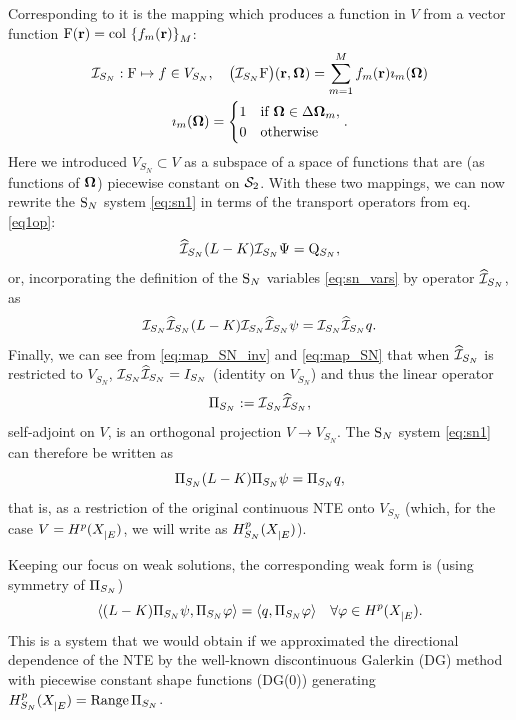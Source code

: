 Corresponding
to it is the mapping which produces a function in $V$ from a vector function \linebreak[4] 
\mbox{$\mathrm{F}(\br) = \colset{f_m(\br)}{\idxset{M}}$}:
\begin{equation}\label{eq:map_SN}
\begin{gathered}
\PiSN: \mathrm{F} \mapsto f\in V_{S_N},\quad
\bigl(\PiSN \mathrm{F}\bigr)(\br,\bomega) = \sum_{m=1}^M f_m(\br)\imath_m(\bomega)\\ 
\imath_m(\bomega) = \pw{1}{if $\bomega \in \Delta\bomega_m$}{0}{otherwise}.
\end{gathered}
\end{equation}
Here we introduced $V_{S_N}\subset V$ as a subspace of a space of functions that are (as functions of $\bomega$)
piecewise constant on $\Sphere$. With these two mappings, we can now rewrite the $\SN$ system
\eqref{eq:sn1} in terms of the transport operators from eq.
\eqref{eq1op}:
\begin{equation}\label{eq:sn_op}
	\PihSN (\op{L} - \op{K}) \PiSN \Psi = \mathrm{Q}_{S_N},
\end{equation}
or, incorporating the definition of the $\SN$ variables \eqref{eq:sn_vars} by operator $\PihSN$, as
\begin{equation}\label{eq:sn_op2}
	\PiSN \PihSN (\op{L} - \op{K})\PiSN \PihSN \psi = \PiSN \PihSN q.
\end{equation} 
Finally, we can see from \eqref{eq:map_SN_inv} and \eqref{eq:map_SN} that when $\PihSN$ is restricted to $V_{S_N}$, 
$\PiSN\PihSN = I_{S_N}$ (identity on $V_{S_N}$) and thus the linear operator
$$
	\Projop[S_N] := \PiSN\PihSN,
$$
self-adjoint on $V$, is an orthogonal projection $V\to V_{S_N}$. The $\SN$ system \eqref{eq:sn1} can
therefore be written as
\begin{equation}\label{eq:sn_op3}
	\Projop[S_N] (\op{L} - \op{K})\Projop[S_N] \psi = \Projop[S_N] q,
\end{equation}
that is, as a restriction of the original continuous NTE onto $V_{S_N}$ (which, for the case $V = \Hp(\XE)$, we will
write as $\Hp_{S_N}(\XE)$).

Keeping our focus on weak solutions, the corresponding weak form is (using
symmetry of $\Projop[S_N]$) $$
	\langle (\op{L}  - \op{K})\Projop[S_N] \psi, \Projop[S_N] \varphi \rangle = \langle q, \Projop[S_N]
	\varphi \rangle\quad \forall \varphi\in \Hp(\XE). 
$$
This is a system that we would obtain if we approximated the directional dependence of the NTE by the well-known
discontinuous Galerkin (DG) method  with piecewise constant shape functions (DG(0))
generating $\Hp_{S_N}(\XE) = \Rng \Projop[S_N]$. 

